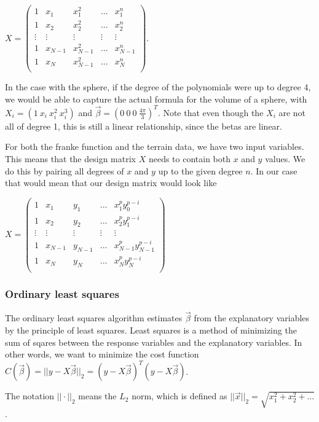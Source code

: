 \documentclass[12pt]{article}
\newcommand{\bbeta}{\vec{\beta}}
\begin{document}
$X=\begin{pmatrix}
    1 & x_1 & x_1^2 & ... & x_1^n \\   
    1 & x_2 & x_2^2 & ... & x_2^n \\   
    \vdots & \vdots & \vdots & \vdots & \vdots\\   
    1 & x_{N-1} & x_{N-1}^2 & ... & x_{N-1}^n \\   
    1 & x_N & x_{N-1}^2 & ... & x_N^n \\   
\end{pmatrix}$.

In the case with the sphere, if the degree of the polynomials were up to degree 4, we would be able to capture the actual formula for the volume of a sphere, with $X_i=(1\ x_i\ x_i^2\ x_i^3)$ and $\bbeta=(0\ 0\ 0\ \frac{4\pi}{3})^T$.
Note that even though the $X_i$ are not all of degree 1, this is still a linear relationship, since the betas are linear.

For both the franke function and the terrain data, we have two input variables. This means that the design matrix $X$ needs to contain both $x$ and $y$ values. We do this by pairing all degrees of $x$ and $y$ up to the given degree $n$.
In our case that would mean that our design matrix would look like

$X=\begin{pmatrix}
    1 & x_1 & y_1 &  ... & x_1^{p}y_0^{p-i} \\   
    1 & x_2 & y_2 &  ... & x_2^{p}y_1^{p-i} \\   
    \vdots & \vdots & \vdots & \vdots & \vdots\\   
    1 & x_{N-1} & y_{N-1} &  ... & x_{N-1}^{p}y_{N-1}^{p-i} \\   
    1 & x_{N} & y_{N} &  ... & x_{N}^{p}y_{N}^{p-i} \\   
\end{pmatrix}$

\subsubsection{Ordinary least squares}

The ordinary least squares algorithm estimates $\bbeta$ from the explanatory variables by the principle of least squares.
Least squares is a method of minimizing the sum of sqares between the response variables and the explanatory variables.
In other words, we want to minimize the cost function $C(\bbeta)=||y - X\bbeta||_2=(y-X \bbeta)^T(y-X\bbeta)$.

The notation $||\cdot||_2$ means the $L_2$ norm, which is defined as $||\vec{x}||_2=\sqrt{x_1^2+x_2^2+...}$.
\end{document}
